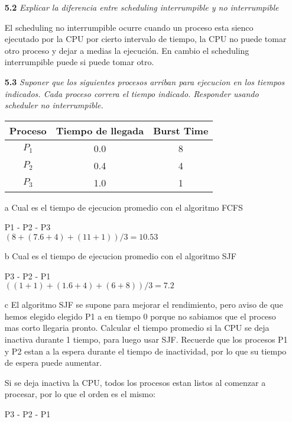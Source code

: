 \begin{itemize}
\item[\textbf{5.2}]\emph{Explicar la diferencia entre scheduling interrumpible y no interrumpible}

El scheduling no interrumpible ocurre cuando un proceso esta sienco ejecutado por la CPU por cierto intervalo de tiempo, la CPU no puede tomar otro proceso y dejar a medias la ejecuci\'on. En cambio el scheduling interrumpible puede si puede tomar otro.

\item[\textbf{5.3}]\emph{Suponer que los siguientes procesos arriban para ejecucion en los tiempos indicados. Cada proceso correra el tiempo indicado. Responder usando scheduler no interrumpible.}

\begin{tabular}{| c | c | c |}
\hline
Proceso & Tiempo de llegada & Burst Time\\\hline
$P_1$ & 0.0 & 8\\
$P_2$ & 0.4 & 4\\
$P_3$ & 1.0 & 1\\\hline
\end{tabular}

\item[a] Cual es el tiempo de ejecucion promedio con el algoritmo FCFS

P1 - P2 - P3\\

$(8 + (7.6 + 4) + (11 + 1))/3 = 10.53$

\item[b] Cual es el tiempo de ejecucion promedio con el algoritmo SJF

P3 - P2 - P1\\

$((1+1) + (1.6 + 4) + (6 + 8))/3 = 7.2$

\item[c] El algoritmo SJF se supone para mejorar el rendimiento, pero aviso de que hemos elegido elegido  P1 a en tiempo 0 porque no sabiamos que el proceso mas corto llegaria pronto. Calcular el tiempo promedio si la CPU se deja inactiva durante 1 tiempo, para luego usar SJF. Recuerde que los procesos P1 y P2 estan a la espera durante el tiempo de inactividad, por lo que su tiempo de espera puede aumentar.

Si se deja inactiva la CPU, todos los procesos estan listos al comenzar a procesar, por lo que el orden es el mismo:

P3 - P2 - P1\\


\end{itemize}
